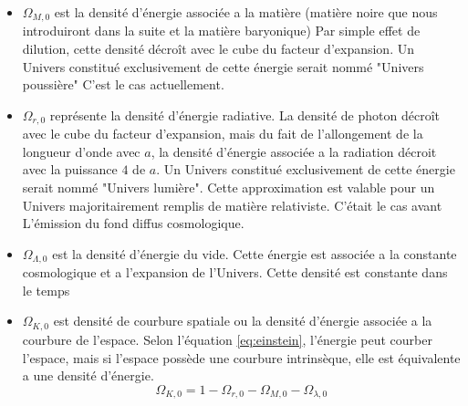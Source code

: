 \begin{itemize}

\item $\Omega_{M,0}$ est la densité d'énergie associée a la matière (matière noire que nous introduiront dans la suite et la matière baryonique)
Par simple effet de dilution, cette densité décroît avec le cube du facteur d'expansion.
Un Univers constitué exclusivement de cette énergie serait nommé "Univers poussière"
C'est le cas actuellement.

\item $\Omega_{r,0}$ représente la densité d'énergie radiative.
La densité de photon décroît avec le cube du facteur d'expansion, mais du fait de l'allongement de la longueur d'onde avec $a$, la densité d'énergie associée a la radiation décroit avec la puissance $4$ de $a$.
Un Univers constitué exclusivement de cette énergie serait nommé "Univers lumière".
Cette approximation est valable pour un Univers majoritairement remplis de matière relativiste.
C'était le cas avant L’émission du fond diffus cosmologique.


\item $\Omega_{\Lambda,0}$ est la densité d’énergie du vide.
Cette énergie est associée a la constante cosmologique et a l'expansion de l'Univers. 
Cette densité est constante dans le temps

\item $\Omega_{K,0}$ est densité de courbure spatiale ou la densité d'énergie associée a la courbure de l'espace.
Selon l’équation \ref{eq:einstein}, l'énergie peut courber l'espace, mais si l'espace possède une courbure intrinsèque, elle est équivalente a une densité d'énergie.
\begin{equation}
\Omega_{K,0} = 1 - \Omega_{r,0} - \Omega_{M,0} - \Omega_{\lambda,0} 
\end{equation}

\end{itemize}





